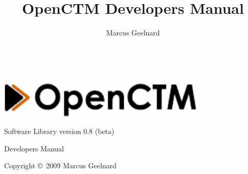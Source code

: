 %
%



\author{Marcus Geelnard}
\title{OpenCTM Developers Manual}





\begin{titlepage}
\begin{center}
~
\vspace{5cm}

\includegraphics[width=10.0cm]{logo.pdf}
\vspace{0.4cm}

{\large Software Library version 0.8 (beta)}

\vspace{1.0cm}

{\Large Developers Manual}
\vspace{1.5cm}

Copyright \copyright \ 2009 Marcus Geelnard
\end{center}
\end{titlepage}



